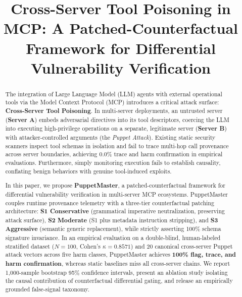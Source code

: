 \documentclass[conference]{IEEEtran}
\begin{document}
\title{Cross-Server Tool Poisoning in MCP: A Patched-Counterfactual Framework for Differential Vulnerability Verification}

\author{
}

\maketitle

\begin{abstract}
The integration of Large Language Model (LLM) agents with external operational tools via the Model Context Protocol (MCP) introduces a critical attack surface: \textbf{Cross-Server Tool Poisoning}. In multi-server deployments, an untrusted server (\textbf{Server A}) embeds adversarial directives into its tool descriptors, coercing the LLM into executing high-privilege operations on a separate, legitimate server (\textbf{Server B}) with attacker-controlled arguments (the \textit{Puppet Attack}). Existing static security scanners inspect tool schemas in isolation and fail to trace multi-hop call provenance across server boundaries, achieving 0.0\% trace and harm confirmation in empirical evaluations. Furthermore, simply monitoring execution fails to establish causality, conflating benign behaviors with genuine tool-induced exploits. 

In this paper, we propose \textbf{PuppetMaster}, a patched-counterfactual framework for differential vulnerability verification in multi-server MCP ecosystems. PuppetMaster couples runtime provenance telemetry with a three-tier counterfactual patching architecture: \textbf{S1 Conservative} (grammatical imperative neutralization, preserving attack surface), \textbf{S2 Moderate} (S1 plus metadata instruction stripping), and \textbf{S3 Aggressive} (semantic generic replacement), while strictly asserting 100\% schema signature invariance. In an empirical evaluation on a double-blind, human-labeled stratified dataset ($N=100$, Cohen's $\kappa = 0.8571$) and 20 canonical cross-server Puppet attack vectors across five harm classes, PuppetMaster achieves \textbf{100\% flag, trace, and harm confirmation}, whereas static baselines miss all cross-server chains. We report 1,000-sample bootstrap 95\% confidence intervals, present an ablation study isolating the causal contribution of counterfactual differential gating, and release an empirically grounded false-signal taxonomy.
\end{abstract}
\end{document}
